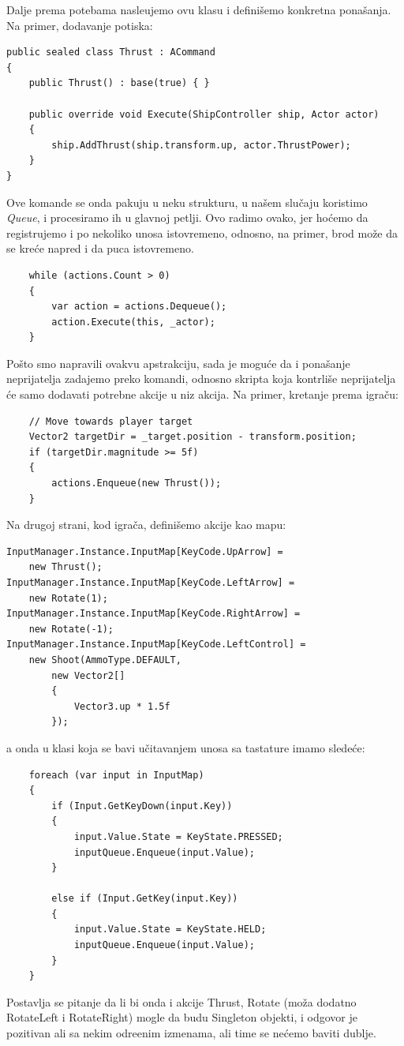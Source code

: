Dalje prema potebama nasle\dj ujemo ovu klasu i defini\v{s}emo konkretna pona\v{s}anja. Na primer,
dodavanje potiska:

\begin{verbatim}
public sealed class Thrust : ACommand
{
    public Thrust() : base(true) { }

    public override void Execute(ShipController ship, Actor actor)
    {
        ship.AddThrust(ship.transform.up, actor.ThrustPower);
    }
}
\end{verbatim}

Ove komande se onda pakuju u neku strukturu, u na\v{s}em slu\v{c}aju koristimo \emph{Queue}, 
i procesiramo ih u glavnoj petlji. Ovo radimo ovako, jer ho\'cemo da registrujemo i po nekoliko
unosa istovremeno, odnosno, na primer, brod mo\v{z}e da se kre\'ce napred i da puca istovremeno.

\begin{verbatim}
    while (actions.Count > 0)
    {
        var action = actions.Dequeue();
        action.Execute(this, _actor);
    }
\end{verbatim}

Po\v{s}to smo napravili ovakvu apstrakciju, sada je mogu\'ce da i pona\v{s}anje neprijatelja
zadajemo preko komandi, odnosno skripta koja kontrli\v{s}e neprijatelja \'ce samo dodavati potrebne
akcije u niz akcija. Na primer, kretanje prema igra\v{c}u:

\begin{verbatim}
    // Move towards player target
    Vector2 targetDir = _target.position - transform.position;
    if (targetDir.magnitude >= 5f)
    {
        actions.Enqueue(new Thrust());
    }
\end{verbatim}

Na drugoj strani, kod igra\v{c}a, defini\v{s}emo akcije kao mapu:

\begin{verbatim}
InputManager.Instance.InputMap[KeyCode.UpArrow] = 
    new Thrust();
InputManager.Instance.InputMap[KeyCode.LeftArrow] = 
    new Rotate(1);
InputManager.Instance.InputMap[KeyCode.RightArrow] = 
    new Rotate(-1);
InputManager.Instance.InputMap[KeyCode.LeftControl] = 
    new Shoot(AmmoType.DEFAULT,
        new Vector2[]
        {
            Vector3.up * 1.5f
        });
\end{verbatim}

a onda u klasi koja se bavi u\v{c}itavanjem unosa sa tastature imamo slede\'ce:

\begin{verbatim}
    foreach (var input in InputMap)
    {
        if (Input.GetKeyDown(input.Key))
        {
            input.Value.State = KeyState.PRESSED;
            inputQueue.Enqueue(input.Value);
        }

        else if (Input.GetKey(input.Key))
        {
            input.Value.State = KeyState.HELD;
            inputQueue.Enqueue(input.Value);
        }
    }
\end{verbatim}

Postavlja se pitanje da li bi onda i akcije Thrust, Rotate (mo\v{z}a dodatno RotateLeft i RotateRight) mogle da budu
Singleton objekti, i odgovor je pozitivan ali sa nekim odre\dj enim izmenama, ali time se ne\'cemo baviti dublje.
